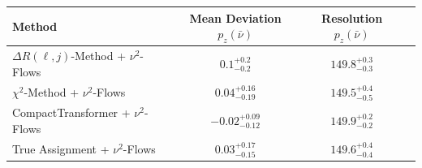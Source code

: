     \begin{tabular}{lccc}
        \toprule
        Method & Mean Deviation $p_{z}(\bar{\nu})$ & Resolution $p_{z}(\bar{\nu})$ \\
        \midrule
        $\Delta R(\ell,j)$-Method + $\nu^2$-Flows & $0.1^{+0.2}_{-0.2}$ & $149.8^{+0.3}_{-0.3}$ \\
        $\chi^2$-Method + $\nu^2$-Flows & $0.04^{+0.16}_{-0.19}$ & $149.5^{+0.4}_{-0.5}$ \\
        CompactTransformer + $\nu^2$-Flows & $-0.02^{+0.09}_{-0.12}$ & $149.9^{+0.2}_{-0.2}$ \\
        True Assignment + $\nu^2$-Flows & $0.03^{+0.17}_{-0.15}$ & $149.6^{+0.4}_{-0.4}$ \\
        \bottomrule
    \end{tabular}